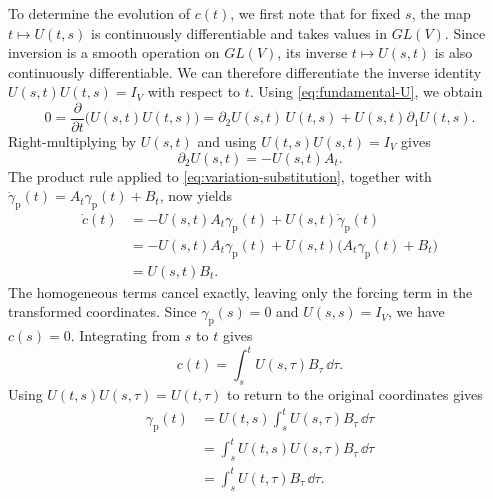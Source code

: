 \documentclass[12pt,a4paper,oneside]{book}
\begin{document}
\begin{example}
\begin{solution}
To determine the evolution of $c(t)$, we first note that for fixed $s$, the map $t\mapsto U(t,s)$ is continuously differentiable
and takes values in $GL(V)$. Since inversion is a smooth operation on $GL(V)$, its inverse $t\mapsto U(s,t)$ is also continuously
differentiable. We can therefore differentiate the inverse identity $U(s,t)U(t,s)=I_V$ with respect to $t$. Using \eqref{eq:fundamental-U},
we obtain
\begin{equation*}
    0 = \frac{\partial}{\partial t} \bigl(U(s,t)U(t,s)\bigr)
    = \partial_2U(s,t)\,U(t,s) +U(s,t)\partial_1U(t,s).
\end{equation*}
Right-multiplying by $U(s,t)$ and using $U(t,s)U(s,t)=I_V$ gives
\begin{equation*}
    \partial_2U(s,t) = -U(s,t)A_t.
\end{equation*}
The product rule applied to \eqref{eq:variation-substitution}, together with $\dot\gamma_{\mathrm p}(t)=A_t\gamma_{\mathrm p}(t)+B_t$, now yields
\begin{equation*}
    \begin{aligned}
        \dot c(t)
        &= -U(s,t)A_t\gamma_{\mathrm p}(t) + U(s,t)\dot\gamma_{\mathrm p}(t)\\
        &= -U(s,t)A_t\gamma_{\mathrm p}(t) + U(s,t)\bigl(A_t\gamma_{\mathrm p}(t)+B_t\bigr)\\
        &= U(s,t)B_t.
    \end{aligned}
\end{equation*}
The homogeneous terms cancel exactly, leaving only the forcing term in the transformed coordinates. Since $\gamma_{\mathrm p}(s)=0$
and $U(s,s)=I_V$, we have $c(s)=0$. Integrating from $s$ to $t$ gives
\begin{equation*}
    c(t)=\int_s^t U(s,\tau)B_{\tau}\,\dd\tau.
\end{equation*}
Using $U(t,s)U(s,\tau)=U(t,\tau)$ to return to the original coordinates gives
\begin{equation*}
    \begin{aligned}
        \gamma_{\mathrm p}(t)
        &= U(t,s)\int_s^t U(s,\tau)B_{\tau}\,\dd\tau\\
        &= \int_s^t U(t,s)U(s,\tau)B_{\tau}\,\dd\tau\\
        &= \int_s^t U(t,\tau)B_{\tau}\,\dd\tau.
    \end{aligned}
\end{equation*}


\end{solution}
\end{example}
\end{document}
